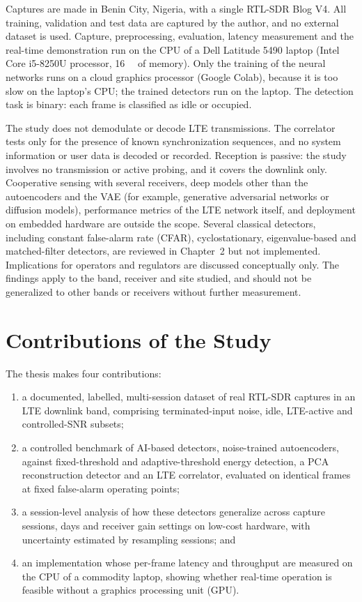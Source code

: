 Captures are made in Benin City, Nigeria, with a single RTL-SDR Blog V4. All training, validation and test data are captured by the author, and no external dataset is used. Capture, preprocessing, evaluation, latency measurement and the real-time demonstration run on the CPU of a Dell Latitude 5490 laptop (Intel Core i5-8250U processor, \qty{16}{\giga\byte} of memory). Only the training of the neural networks runs on a cloud graphics processor (Google Colab), because it is too slow on the laptop's CPU; the trained detectors run on the laptop. The detection task is binary: each frame is classified as idle or occupied.

The study does not demodulate or decode LTE transmissions. The \syncsignal{} correlator tests only for the presence of known synchronization sequences, and no system information or user data is decoded or recorded. Reception is passive: the study involves no transmission or active probing, and it covers the downlink only. Cooperative sensing with several receivers, deep models other than the autoencoders and the VAE (for example, generative adversarial networks or diffusion models), performance metrics of the LTE network itself, and deployment on embedded hardware are outside the scope. Several classical detectors, including constant false-alarm rate (CFAR), cyclostationary, eigenvalue-based and matched-filter detectors, are reviewed in Chapter~2 but not implemented. Implications for operators and regulators are discussed conceptually only. The findings apply to the band, receiver and site studied, and should not be generalized to other bands or receivers without further measurement.

\section{Contributions of the Study}
\label{sec:contributions}

The thesis makes four contributions:

\begin{enumerate}[label=\arabic*., leftmargin=*]
  \item a documented, labelled, multi-session dataset of real RTL-SDR captures in an LTE downlink band, comprising terminated-input noise, idle, LTE-active and controlled-SNR subsets;
  \item a controlled benchmark of AI-based detectors, noise-trained autoencoders, against fixed-threshold and adaptive-threshold energy detection, a PCA reconstruction detector and an LTE \syncsignal{} correlator, evaluated on identical frames at fixed false-alarm operating points;
  \item a session-level analysis of how these detectors generalize across capture sessions, days and receiver gain settings on low-cost hardware, with uncertainty estimated by resampling sessions; and
  \item an implementation whose per-frame latency and throughput are measured on the CPU of a commodity laptop, showing whether real-time operation is feasible without a graphics processing unit (GPU).
\end{enumerate}

